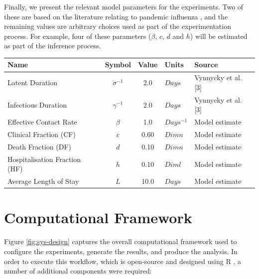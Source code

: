 \documentclass[10pt,letterpaper]{article}
\begin{document}
Finally, we present the relevant model parameters for the experiments. Two of these are based on the literature relating to pandemic influenza \citep{vynnycky2008analyses}, and the remaining values are arbitrary choices used as part of the experimentation process. For example, four of these parameters (\(\beta\), \(c\), \(d\) and \(h\)) will be estimated as part of the inference process.

\begin{center}  
\begin{tabular}{ | l | c | c | l | l |} %
\hline  
Name & Symbol & Value  & Units & Source \\ \hline  
Latent Duration & $\sigma^{-1}$ & 2.0 & $Days$ & Vynnycky et al. [3]\\ \hline  
Infectious Duration & $\gamma^{-1}$ & 2.0 & $Days$ & Vynnycky et al. [3]\\ \hline  
Effective Contact Rate & $\beta$ & 1.0 & $Days^{-1}$ & Model estimate\\ \hline  
Clinical Fraction (CF)& $c$ & 0.60 & $Dimn$ & Model estimate\\ \hline  
Death Fraction (DF) & $d$ & 0.10 & $Dimn$ & Model estimate\\ \hline 
Hospitalisation Fraction (HF) & $h$ & 0.10 & $Diml$ & Model estimate\\ \hline 
Average Length of Stay & $L$ & 10.0 & $Days$ & Model estimate\\ \hline 
\end{tabular}  
\end{center}

\hypertarget{computational-framework}{%
\section{Computational Framework}\label{computational-framework}}

Figure \ref{fig:sys-design} captures the overall computational framework used to configure the experiments, generate the results, and produce the analysis. In order to execute this workflow, which is open-source and designed using R \citep{duggan2016system}, a number of additional components were required:
\end{document}
